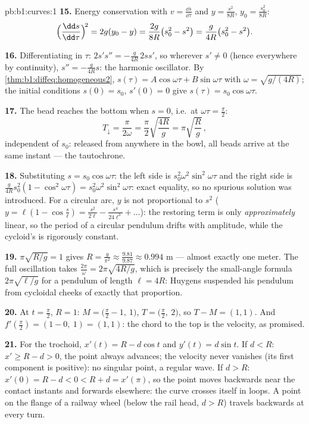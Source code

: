 \begin{solution}{pb:b1:curves:1}
\textbf{15.} Energy conservation with $v = \frac{\dd s}{\dd\tau}$
and $y = \frac{s^2}{8R}$, $y_0 = \frac{s_0^2}{8R}$:
\[
\Bigl(\frac{\dd s}{\dd\tau}\Bigr)^{\!2} = 2g(y_0 - y)
= \frac{2g}{8R}\bigl(s_0^2 - s^2\bigr)
= \frac{g}{4R}\bigl(s_0^2 - s^2\bigr).
\]

\textbf{16.} Differentiating in $\tau$: $2s's'' =
-\frac{g}{4R}\,2ss'$, so wherever $s' \neq 0$ (hence everywhere
by continuity), $s'' = -\frac{g}{4R}s$: the harmonic oscillator.
By \cref{thm:b1:diffeq:homogeneous2}, $s(\tau) =
A\cos\omega\tau + B\sin\omega\tau$ with $\omega =
\sqrt{g/(4R)}$; the initial conditions $s(0) = s_0$, $s'(0) = 0$
give $s(\tau) = s_0\cos\omega\tau$.

\textbf{17.} The bead reaches the bottom when $s = 0$, i.e.\ at
$\omega\tau = \frac\pi2$:
\[
T_{\downarrow} = \frac{\pi}{2\omega}
= \frac\pi2\sqrt{\frac{4R}{g}} = \pi\sqrt{\frac Rg}\,,
\]
independent of $s_0$: released from anywhere in the bowl, all
beads arrive at the same instant --- the tautochrone.

\textbf{18.} Substituting $s = s_0\cos\omega\tau$: the left side
is $s_0^2\omega^2\sin^2\omega\tau$ and the right side is
$\frac{g}{4R}s_0^2(1 - \cos^2\omega\tau) =
s_0^2\omega^2\sin^2\omega\tau$: exact equality, so no spurious
solution was introduced. For a circular arc, $y$ is not
proportional to $s^2$ ($y = \ell(1 - \cos\frac s\ell) =
\frac{s^2}{2\ell} - \frac{s^4}{24\ell^3} + \dots$): the
restoring term is only \emph{approximately} linear, so the
period of a circular pendulum drifts with amplitude, while the
cycloid's is rigorously constant.

\textbf{19.} $\pi\sqrt{R/g} = 1$ gives $R = \frac{g}{\pi^2}
\approx \frac{9.81}{9.87} \approx 0.994$ m --- almost exactly
one meter. The full oscillation takes $\frac{2\pi}\omega =
2\pi\sqrt{4R/g}$, which is precisely the small-angle formula
$2\pi\sqrt{\ell/g}$ for a pendulum of length $\ell = 4R$:
Huygens suspended his pendulum from cycloidal cheeks of exactly
that proportion.

\textbf{20.} At $t = \frac\pi2$, $R = 1$: $M = \bigl(\frac\pi2 -
1,\ 1\bigr)$, $T = \bigl(\frac\pi2,\ 2\bigr)$, so $T - M = (1,
1)$. And $f'(\frac\pi2) = (1 - 0,\ 1) = (1, 1)$: the chord to
the top is the velocity, as promised.

\textbf{21.} For the trochoid, $x'(t) = R - d\cos t$ and $y'(t)
= d\sin t$. If $d < R$: $x' \geq R - d > 0$, the point always
advances; the velocity never vanishes (its first component is
positive): no singular point, a regular wave. If $d > R$: $x'(0)
= R - d < 0 < R + d = x'(\pi)$, so the point moves backwards
near the contact instants and forwards elsewhere: the curve
crosses itself in loops. A point on the flange of a railway
wheel (below the rail head, $d > R$) travels backwards at every
turn.


\end{solution}

